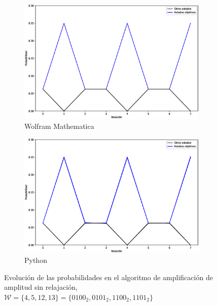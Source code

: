 \documentclass[xetex,mathserif,serif]{beamer}
\begin{document}
\begin{frame}
\begin{figure}[H]
    \centering
    \begin{subfigure}[m]{0.49\textwidth}
        \centering
        \includegraphics[width=0.9\linewidth]{img/grover3M.eps}
        \caption{Wolfram Mathematica}
    \end{subfigure}
    \begin{subfigure}[m]{0.49\textwidth}
        \centering
        \includegraphics[width=0.9\linewidth]{img/grover3lossless.eps}
        \caption{Python}
    \end{subfigure}
    \caption[Evolución de las probabilidades en el algoritmo de amplificación de amplitud sin relajación, $\mathcal{W} = \{4, 5, 12, 13\}$]{Evolución de las probabilidades en el algoritmo de amplificación de amplitud sin relajación, $\mathcal{W} = \{4, 5, 12, 13\} = \{0100_2, 0101_2, 1100_2, 1101_2\}$}
    \label{fig:groverlosslesscomp3}
\end{figure}


\end{frame}
\end{document}
